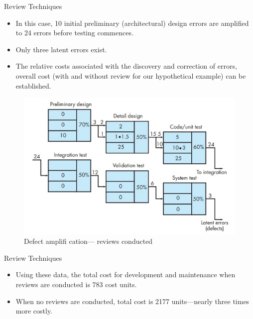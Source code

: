 \documentclass{beamer}
\begin{document}
\begin{frame}{Review Techniques}
	\begin{itemize}
		\item In this case, 10 initial preliminary (architectural) design errors are amplified to 24 errors before testing commences. 
		\item Only three latent errors exist. 
		\item The relative costs associated with the discovery and correction of errors, overall cost (with and without review for our hypothetical example) can be established.
		
		
	\end{itemize}
	\begin{figure}
		\includegraphics[scale=.5]{img/m3_18}
		\caption{Defect 
			amplifi cation—
			reviews 
			conducted}
	\end{figure}
\end{frame}
\begin{frame}{Review Techniques}
	\begin{itemize}
		\item Using these data, the total cost for development and maintenance when reviews are conducted is 783 cost units. 
		\item When no reviews are conducted, total cost is 2177 units—nearly three times more costly.
		
	\end{itemize}
\end{frame}
\end{document}
